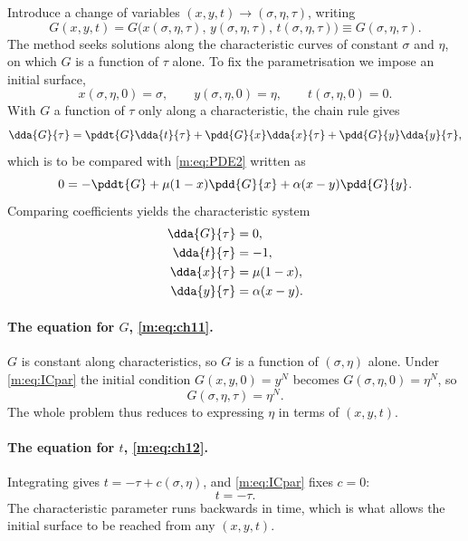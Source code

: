 Introduce a change of variables $(x,y,t)\to(\sigma,\eta,\tau)$, writing
\begin{equation*}
G(x,y,t) = G\bigl(x(\sigma,\eta,\tau),\,y(\sigma,\eta,\tau),\,t(\sigma,\eta,\tau)\bigr)
\equiv G(\sigma,\eta,\tau).
\end{equation*}
The method seeks solutions along the characteristic curves of constant $\sigma$ and
$\eta$, on which $G$ is a function of $\tau$ alone. To fix the parametrisation we
impose an initial surface,
\begin{equation}
\label{m:eq:ICpar}
x(\sigma,\eta,0) = \sigma,
\qquad
y(\sigma,\eta,0) = \eta,
\qquad
t(\sigma,\eta,0) = 0 .
\end{equation}
With $G$ a function of $\tau$ only along a characteristic, the chain rule gives
\begin{equation*}
\dda{G}{\tau} = \pddt{G}\dda{t}{\tau} + \pdd{G}{x}\dda{x}{\tau} + \pdd{G}{y}\dda{y}{\tau},
\end{equation*}
which is to be compared with \cref{m:eq:PDE2} written as
\begin{equation*}
0 = -\pddt{G} + \mu(1-x)\pdd{G}{x} + \alpha(x-y)\pdd{G}{y} .
\end{equation*}
Comparing coefficients yields the characteristic system
\begin{align}
\dda{G}{\tau} &= 0, \label{m:eq:ch11}\\
\dda{t}{\tau} &= -1, \label{m:eq:ch12}\\
\dda{x}{\tau} &= \mu(1-x), \label{m:eq:ch13}\\
\dda{y}{\tau} &= \alpha(x-y). \label{m:eq:ch14}
\end{align}

\paragraph{The equation for $G$, \eqref{m:eq:ch11}.}
$G$ is constant along characteristics, so $G$ is a function of $(\sigma,\eta)$
alone. Under \cref{m:eq:ICpar} the initial condition $G(x,y,0)=y^N$ becomes
$G(\sigma,\eta,0)=\eta^N$, so
\begin{equation}
\label{m:eq:GetaN}
G(\sigma,\eta,\tau) = \eta^N .
\end{equation}
The whole problem thus reduces to expressing $\eta$ in terms of $(x,y,t)$.

\paragraph{The equation for $t$, \eqref{m:eq:ch12}.}
Integrating gives $t = -\tau + c(\sigma,\eta)$, and \cref{m:eq:ICpar} fixes $c=0$:
\begin{equation}
\label{m:eq:minustau}
t = -\tau .
\end{equation}
The characteristic parameter runs backwards in time, which is what allows the
initial surface to be reached from any $(x,y,t)$.

